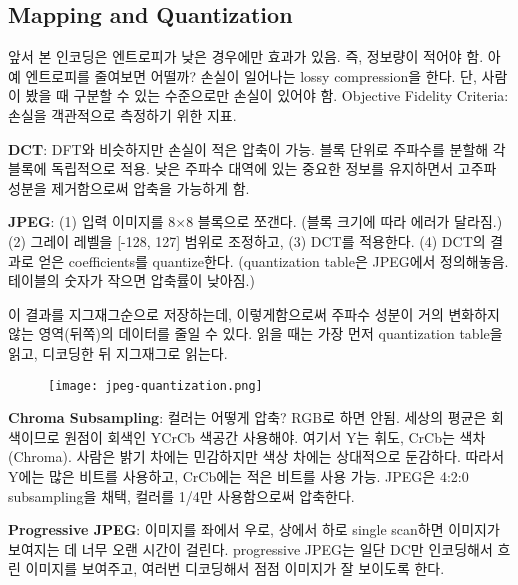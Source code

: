 \subsection{Mapping and Quantization}

앞서 본 인코딩은 엔트로피가 낮은 경우에만 효과가 있음. 즉, 정보량이 적어야 함. 아예 엔트로피를 줄여보면 어떨까? 손실이 일어나는 lossy compression을 한다. 단, 사람이 봤을 때 구분할 수 있는 수준으로만 손실이 있어야 함. Objective Fidelity Criteria: 손실을 객관적으로 측정하기 위한 지표.

\textbf{DCT}: DFT와 비슷하지만 손실이 적은 압축이 가능. 블록 단위로 주파수를 분할해 각 블록에 독립적으로 적용. 낮은 주파수 대역에 있는 중요한 정보를 유지하면서 고주파 성분을 제거함으로써 압축을 가능하게 함.

\textbf{JPEG}: (1) 입력 이미지를 8$\times$8 블록으로 쪼갠다. (블록 크기에 따라 에러가 달라짐.) (2) 그레이 레벨을 [-128, 127] 범위로 조정하고, (3) DCT를 적용한다. (4) DCT의 결과로 얻은 coefficients를 quantize한다. (quantization table은 JPEG에서 정의해놓음. 테이블의 숫자가 작으면 압축률이 낮아짐.)

이 결과를 지그재그순으로 저장하는데, 이렇게함으로써 주파수 성분이 거의 변화하지 않는 영역(뒤쪽)의 데이터를 줄일 수 있다. 읽을 때는 가장 먼저 quantization table을 읽고, 디코딩한 뒤 지그재그로 읽는다.

\begin{figure}[h]
  \centering
  \texttt{[image: jpeg-quantization.png]}
\end{figure}

\textbf{Chroma Subsampling}: 컬러는 어떻게 압축? RGB로 하면 안됨. 세상의 평균은 회색이므로 원점이 회색인 YCrCb 색공간 사용해야. 여기서 Y는 휘도, CrCb는 색차(Chroma). 사람은 밝기 차에는 민감하지만 색상 차에는 상대적으로 둔감하다. 따라서 Y에는 많은 비트를 사용하고, CrCb에는 적은 비트를 사용 가능. JPEG은 4:2:0 subsampling을 채택, 컬러를 1/4만 사용함으로써 압축한다.

\textbf{Progressive JPEG}: 이미지를 좌에서 우로, 상에서 하로 single scan하면 이미지가 보여지는 데 너무 오랜 시간이 걸린다. progressive JPEG는 일단 DC만 인코딩해서 흐린 이미지를 보여주고, 여러번 디코딩해서 점점 이미지가 잘 보이도록 한다.

